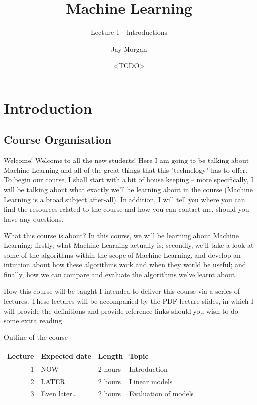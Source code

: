 \documentclass[10pt]{beamer}
\author{Jay Morgan}
\date{<TODO>}
\title{Machine Learning}
\subtitle{Lecture 1 - Introductions}
\begin{document}
\maketitle

\section*{Introduction}
\label{sec:orgff7a7de}

\subsection*{Course Organisation}
\label{sec:org17986c6}

\begin{frame}[label={sec:org3eb66e3}]{Welcome!}
Welcome to all the new students! Here I am going to be talking about Machine Learning
and all of the great things that this "technology" has to offer. To begin our course,
I shall start with a bit of house keeping -- more specifically, I will be talking
about what exactly we'll be learning about in the course (Machine Learning is a broad
subject after-all). In addition, I will tell you where you can find the resources
related to the course and how you can contact me, should you have any questions.
\end{frame}

\begin{frame}[label={sec:orgfb2fc43}]{What this course is about?}
In this course, we will be learning about Machine Learning: firstly, what Machine
Learning actually is; secondly, we'll take a look at some of the algorithms within
the scope of Machine Learning, and develop an intuition about how these algorithms
work and when they would be useful; and finally, how we can compare and evaluate the
algorithms we've learnt about.
\end{frame}

\begin{frame}[label={sec:org73e270f}]{How this course will be taught}
I intended to deliver this course via a series of lectures. These lectures will be
accompanied by the PDF lecture slides, in which I will provide the definitions and
provide reference links should you wish to do some extra reading.
\end{frame}

\begin{frame}[label={sec:orgaa9fcf2}]{Outline of the course}
\begin{center}
\begin{tabular}{rlll}
\toprule
Lecture & Expected date & Length & Topic\\
\midrule
1 & NOW & 2 hours & Introduction\\
2 & LATER & 2 hours & Linear models\\
3 & Even later\ldots{} & 2 hours & Evaluation of models\\
\bottomrule
\end{tabular}
\end{center}
\end{frame}
\end{document}

